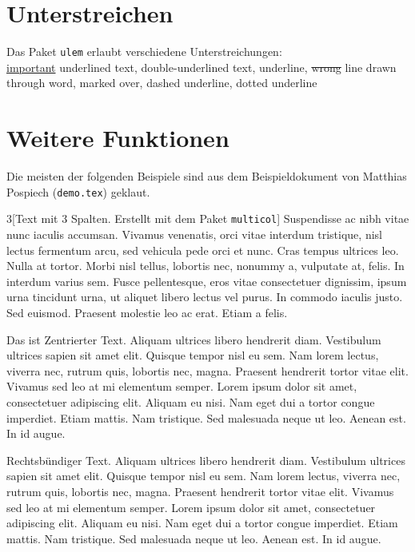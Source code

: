 \section{Unterstreichen}

Das Paket \texttt{ulem} erlaubt verschiedene Unterstreichungen:\\
\uline{important} underlined text,  double-underlined text,  underline, \sout{wrong} line drawn through word,  marked over,  dashed underline,  dotted underline\\

\section{Weitere Funktionen}

Die meisten der folgenden Beispiele sind aus dem Beispieldokument von Matthias Pospiech (\texttt{demo.tex}) geklaut.

\begin{multicols}{3}[Text mit 3 Spalten. Erstellt mit dem Paket \texttt{multicol}]
Suspendisse ac nibh vitae nunc iaculis accumsan. Vivamus venenatis, orci vitae interdum tristique, nisl lectus fermentum arcu, sed vehicula pede orci et nunc. Cras tempus ultrices leo. Nulla at tortor. Morbi nisl tellus, lobortis nec, nonummy a, vulputate at, felis. In interdum varius sem. Fusce pellentesque, eros vitae consectetuer dignissim, ipsum urna tincidunt urna, ut aliquet libero lectus vel purus. In commodo iaculis justo. Sed euismod. Praesent molestie leo ac erat. Etiam a felis.
\end{multicols} 

\begin{center}
Das ist Zentrierter Text.
Aliquam ultrices libero hendrerit diam. Vestibulum ultrices sapien sit amet elit. Quisque tempor nisl eu sem. Nam lorem lectus, viverra nec, rutrum quis, lobortis nec, magna. Praesent hendrerit tortor vitae elit. Vivamus sed leo at mi elementum semper. Lorem ipsum dolor sit amet, consectetuer adipiscing elit. Aliquam eu nisi. Nam eget dui a tortor congue imperdiet. Etiam mattis. Nam tristique. Sed malesuada neque ut leo. Aenean est. In id augue.
\end{center}

\begin{flushright}
Rechtsbündiger Text.
Aliquam ultrices libero hendrerit diam. Vestibulum ultrices sapien sit amet elit. Quisque tempor nisl eu sem. Nam lorem lectus, viverra nec, rutrum quis, lobortis nec, magna. Praesent hendrerit tortor vitae elit. Vivamus sed leo at mi elementum semper. Lorem ipsum dolor sit amet, consectetuer adipiscing elit. Aliquam eu nisi. Nam eget dui a tortor congue imperdiet. Etiam mattis. Nam tristique. Sed malesuada neque ut leo. Aenean est. In id augue.
\end{flushright}

